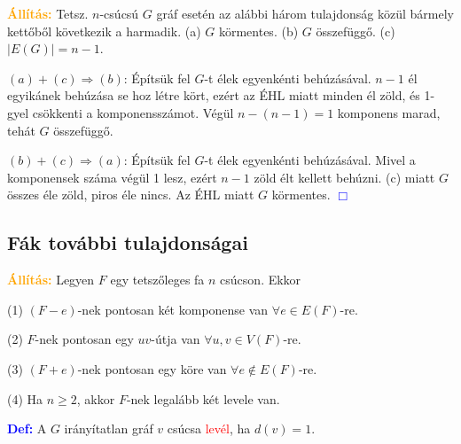 \documentclass[../szamtud.tex]{subfiles}
\begin{document}
        \textcolor{orange}{\textbf{Állítás:}} Tetsz. $n$-csúcsú $G$ gráf esetén az alábbi három tulajdonság közül bármely kettőből következik a harmadik. (a) $G$ körmentes. \qquad (b) $G$ összefüggő. \qquad (c) $|E(G)|=n-1$. 


        $(a)+(c)\Rightarrow (b)$: Építsük fel $G$-t élek egyenkénti behúzásával. $n-1$ él egyikánek behúzása se hoz létre kört, ezért az ÉHL miatt minden él zöld, és 1-gyel csökkenti a komponensszámot. Végül $n-(n-1)=1$ komponens marad, tehát $G$ összefüggő.

        $(b)+(c) \Rightarrow (a)$: Építsük fel $G$-t élek egyenkénti behúzásával. Mivel a komponensek száma végül 1 lesz, ezért $n-1$ zöld élt kellett behúzni. (c) miatt $G$ összes éle zöld, piros éle nincs. Az ÉHL miatt $G$ körmentes. \textcolor{blue}{$\Box$} 

    \subsection{Fák további tulajdonságai}

        \textcolor{orange}{\textbf{Állítás:}} Legyen $F$ egy tetszőleges fa $n$ csúcson. Ekkor 

        (1) $(F-e)$-nek pontosan két komponense van $\forall e\in E(F)$-re.

        (2) $F$-nek pontosan egy $uv$-útja van $\forall u,v\in V(F)$-re.

        (3) $(F+e)$-nek pontosan egy köre van $\forall e\notin E(F)$-re.

        (4) Ha $n \geq 2$, akkor $F$-nek legalább két levele van.

        \textcolor{blue}{\textbf{Def:}} A $G$ irányítatlan gráf $v$ csúcsa \textcolor{red}{levél}, ha $d(v)=1$.

    
    
\end{document}
